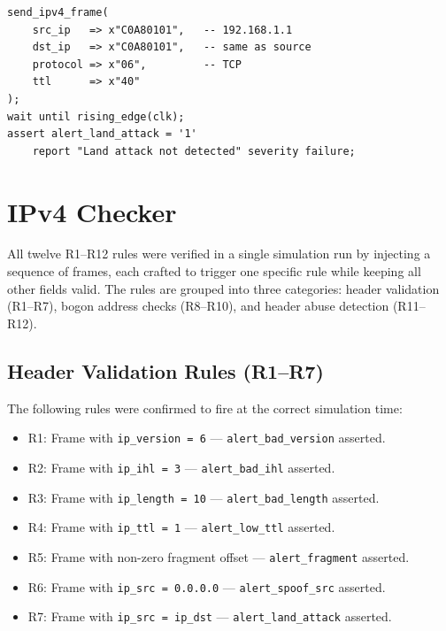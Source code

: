 \documentclass[12pt, a4paper]{report}
\begin{document}
\begin{lstlisting}[caption={Injecting a land attack in the testbench}, label=lst:landattack]
send_ipv4_frame(
    src_ip   => x"C0A80101",   -- 192.168.1.1
    dst_ip   => x"C0A80101",   -- same as source
    protocol => x"06",         -- TCP
    ttl      => x"40"
);
wait until rising_edge(clk);
assert alert_land_attack = '1'
    report "Land attack not detected" severity failure;
\end{lstlisting}

\section{IPv4 Checker}

All twelve R1--R12 rules were verified in a single simulation run by injecting
a sequence of frames, each crafted to trigger one specific rule while keeping
all other fields valid. The rules are grouped into three categories:
header validation (R1--R7), bogon address checks (R8--R10), and header
abuse detection (R11--R12).

\subsection*{Header Validation Rules (R1--R7)}
The following rules were confirmed to fire at the correct simulation time:
\begin{itemize}
    \item R1: Frame with \texttt{ip\_version = 6} --- \texttt{alert\_bad\_version} asserted.
    \item R2: Frame with \texttt{ip\_ihl = 3} --- \texttt{alert\_bad\_ihl} asserted.
    \item R3: Frame with \texttt{ip\_length = 10} --- \texttt{alert\_bad\_length} asserted.
    \item R4: Frame with \texttt{ip\_ttl = 1} --- \texttt{alert\_low\_ttl} asserted.
    \item R5: Frame with non-zero fragment offset --- \texttt{alert\_fragment} asserted.
    \item R6: Frame with \texttt{ip\_src = 0.0.0.0} --- \texttt{alert\_spoof\_src} asserted.
    \item R7: Frame with \texttt{ip\_src = ip\_dst} --- \texttt{alert\_land\_attack} asserted.
\end{itemize}
\end{document}
